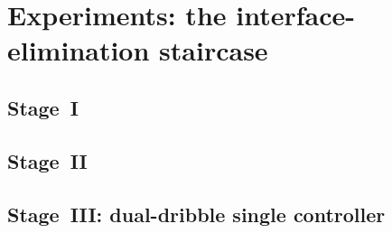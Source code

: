 \section{Experiments: the interface-elimination staircase}
\label{sec:experiments}

\subsection{Stage~I}
\label{sec:exp-stage-I}

\subsection{Stage~II}
\label{sec:exp-stage-II}

\subsection{Stage~III: dual-dribble single controller}
\label{sec:exp-stage-III}
